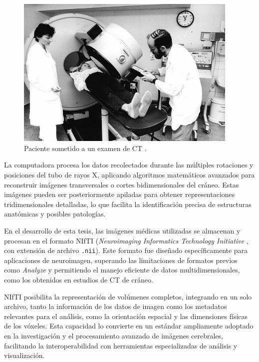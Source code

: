 \begin{figure}[H]
    \centering
    \includegraphics[width=0.95\textwidth]{Graphics/Bundesarchiv_Bild_183-1989-0921-014,_Schwerin,_Bezirkskrankenhaus,_Computertomograf.jpg}
    \caption{Paciente sometido a un examen de CT \cite{bundesarchiv1989}.}
    \label{fig:patient-ct-scan}
\end{figure}

La computadora procesa los datos recolectados durante las múltiples rotaciones y posiciones del tubo de rayos X, aplicando algoritmos matemáticos avanzados para reconstruir imágenes transversales o cortes bidimensionales del cráneo. Estas imágenes pueden ser posteriormente apiladas para obtener representaciones tridimensionales detalladas, lo que facilita la identificación precisa de estructuras anatómicas y posibles patologías.%

En el desarrollo de esta tesis, las imágenes médicas utilizadas se almacenan y procesan en el formato NIfTI (\textit{Neuroimaging Informatics Technology Initiative} \cite{cox2004nifti}, con extensión de archivo \texttt{.nii}). Este formato fue diseñado específicamente para aplicaciones de neuroimagen, superando las limitaciones de formatos previos como \textit{Analyze} y permitiendo el manejo eficiente de datos multidimensionales, como los obtenidos en estudios de CT de cráneo.

NIfTI posibilita la representación de volúmenes completos, integrando en un solo archivo, tanto la información de los datos de imagen como los metadatos relevantes para el análisis, como la orientación espacial y las dimensiones físicas de los vóxeles. Esta capacidad lo convierte en un estándar ampliamente adoptado en la investigación y el procesamiento avanzado de imágenes cerebrales, facilitando la interoperabilidad con herramientas especializadas de análisis y visualización.%

